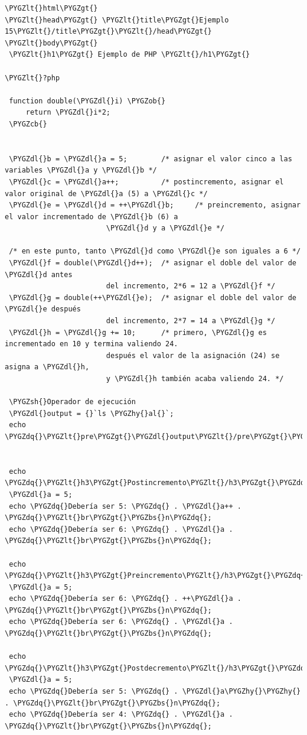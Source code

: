 \documentclass[a5paper,10pt,spanish]{sphinxmanual}
\def\PYGZbs{\char`\\}
\def\PYGZob{\char`\{}
\def\PYGZcb{\char`\}}
\def\PYGZlt{\char`\<}
\def\PYGZgt{\char`\>}
\def\PYGZsh{\char`\#}
\def\PYGZdl{\char`\$}
\def\PYGZhy{\char`\-}
\def\PYGZdq{\char`\"}
\begin{document}
\begin{Verbatim}[commandchars=\\\{\}]
\PYGZlt{}html\PYGZgt{}
\PYGZlt{}head\PYGZgt{} \PYGZlt{}title\PYGZgt{}Ejemplo 15\PYGZlt{}/title\PYGZgt{}\PYGZlt{}/head\PYGZgt{}
\PYGZlt{}body\PYGZgt{}
 \PYGZlt{}h1\PYGZgt{} Ejemplo de PHP \PYGZlt{}/h1\PYGZgt{}

\PYGZlt{}?php

 function double(\PYGZdl{}i) \PYGZob{}
     return \PYGZdl{}i*2;
 \PYGZcb{}


 \PYGZdl{}b = \PYGZdl{}a = 5;        /* asignar el valor cinco a las variables \PYGZdl{}a y \PYGZdl{}b */
 \PYGZdl{}c = \PYGZdl{}a++;          /* postincremento, asignar el valor original de \PYGZdl{}a (5) a \PYGZdl{}c */
 \PYGZdl{}e = \PYGZdl{}d = ++\PYGZdl{}b;     /* preincremento, asignar el valor incrementado de \PYGZdl{}b (6) a
                        \PYGZdl{}d y a \PYGZdl{}e */

 /* en este punto, tanto \PYGZdl{}d como \PYGZdl{}e son iguales a 6 */
 \PYGZdl{}f = double(\PYGZdl{}d++);  /* asignar el doble del valor de \PYGZdl{}d antes
                        del incremento, 2*6 = 12 a \PYGZdl{}f */
 \PYGZdl{}g = double(++\PYGZdl{}e);  /* asignar el doble del valor de \PYGZdl{}e después
                        del incremento, 2*7 = 14 a \PYGZdl{}g */
 \PYGZdl{}h = \PYGZdl{}g += 10;      /* primero, \PYGZdl{}g es incrementado en 10 y termina valiendo 24.
                        después el valor de la asignación (24) se asigna a \PYGZdl{}h,
                        y \PYGZdl{}h también acaba valiendo 24. */

 \PYGZsh{}Operador de ejecución
 \PYGZdl{}output = {}`ls \PYGZhy{}al{}`;
 echo \PYGZdq{}\PYGZlt{}pre\PYGZgt{}\PYGZdl{}output\PYGZlt{}/pre\PYGZgt{}\PYGZlt{}br\PYGZgt{}\PYGZdq{};


 echo \PYGZdq{}\PYGZlt{}h3\PYGZgt{}Postincremento\PYGZlt{}/h3\PYGZgt{}\PYGZdq{};
 \PYGZdl{}a = 5;
 echo \PYGZdq{}Debería ser 5: \PYGZdq{} . \PYGZdl{}a++ . \PYGZdq{}\PYGZlt{}br\PYGZgt{}\PYGZbs{}n\PYGZdq{};
 echo \PYGZdq{}Debería ser 6: \PYGZdq{} . \PYGZdl{}a . \PYGZdq{}\PYGZlt{}br\PYGZgt{}\PYGZbs{}n\PYGZdq{};

 echo \PYGZdq{}\PYGZlt{}h3\PYGZgt{}Preincremento\PYGZlt{}/h3\PYGZgt{}\PYGZdq{};
 \PYGZdl{}a = 5;
 echo \PYGZdq{}Debería ser 6: \PYGZdq{} . ++\PYGZdl{}a . \PYGZdq{}\PYGZlt{}br\PYGZgt{}\PYGZbs{}n\PYGZdq{};
 echo \PYGZdq{}Debería ser 6: \PYGZdq{} . \PYGZdl{}a . \PYGZdq{}\PYGZlt{}br\PYGZgt{}\PYGZbs{}n\PYGZdq{};

 echo \PYGZdq{}\PYGZlt{}h3\PYGZgt{}Postdecremento\PYGZlt{}/h3\PYGZgt{}\PYGZdq{};
 \PYGZdl{}a = 5;
 echo \PYGZdq{}Debería ser 5: \PYGZdq{} . \PYGZdl{}a\PYGZhy{}\PYGZhy{} . \PYGZdq{}\PYGZlt{}br\PYGZgt{}\PYGZbs{}n\PYGZdq{};
 echo \PYGZdq{}Debería ser 4: \PYGZdq{} . \PYGZdl{}a . \PYGZdq{}\PYGZlt{}br\PYGZgt{}\PYGZbs{}n\PYGZdq{};


\end{Verbatim}
\end{document}
